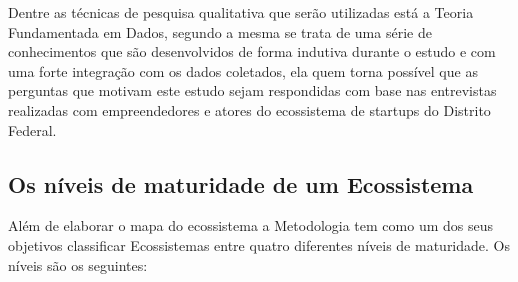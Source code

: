 Dentre as técnicas de pesquisa qualitativa que serão utilizadas está a Teoria Fundamentada em Dados, segundo  a mesma se trata de uma série de conhecimentos que são desenvolvidos de forma indutiva durante o estudo e com uma forte integração com os dados coletados, ela quem torna possível que as perguntas que motivam este estudo sejam respondidas com base nas entrevistas realizadas com empreendedores e atores do ecossistema de startups do Distrito Federal.

\subsection{Os níveis de maturidade de um Ecossistema}
\label{subsection:niveis_de_maturidade_de_um_ecossistema}

Além de elaborar o mapa do ecossistema a Metodologia tem como um dos seus objetivos classificar Ecossistemas entre quatro diferentes níveis de maturidade. Os níveis são os seguintes:


